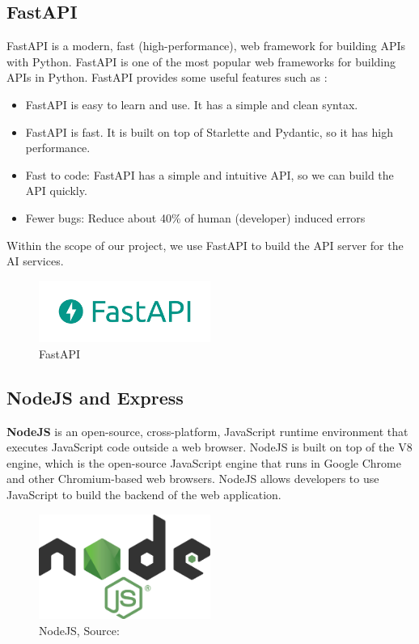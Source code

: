 \subsection{FastAPI}
FastAPI is a modern, fast (high-performance), web framework for building APIs with Python. FastAPI is one of the most popular web frameworks for building APIs in Python. FastAPI provides some useful features such as \cite{fastapi}:
\begin{itemize}
    \item FastAPI is easy to learn and use. It has a simple and clean syntax.
    \item FastAPI is fast. It is built on top of Starlette and Pydantic, so it has high performance.
    \item Fast to code: FastAPI has a simple and intuitive API, so we can build the API quickly.
    \item Fewer bugs: Reduce about 40\% of human (developer) induced errors
\end{itemize} 

\noindent Within the scope of our project, we use FastAPI to build the API server for the AI services. 

\begin{figure}[ht]
    \centering
    \includegraphics[width=0.5\textwidth]{../Images/8.Technology_Stack/fastapi_logo.png}
    \caption{FastAPI}
    \label{fig:fastapi}
\end{figure}

\subsection{NodeJS and Express}
\textbf{NodeJS} is an open-source, cross-platform, JavaScript runtime environment that executes JavaScript code outside a web browser. NodeJS is built on top of the V8 engine, which is the open-source JavaScript engine that runs in Google Chrome and other Chromium-based web browsers. NodeJS allows developers to use JavaScript to build the backend of the web application.
\begin{figure}[ht]
    \centering
    \includegraphics[width=0.5\textwidth]{../Images/8.Technology_Stack/nodejs_logo.png}
    \caption{NodeJS, Source: \cite{nodejs}}
    \label{fig:nodejs}
\end{figure}

